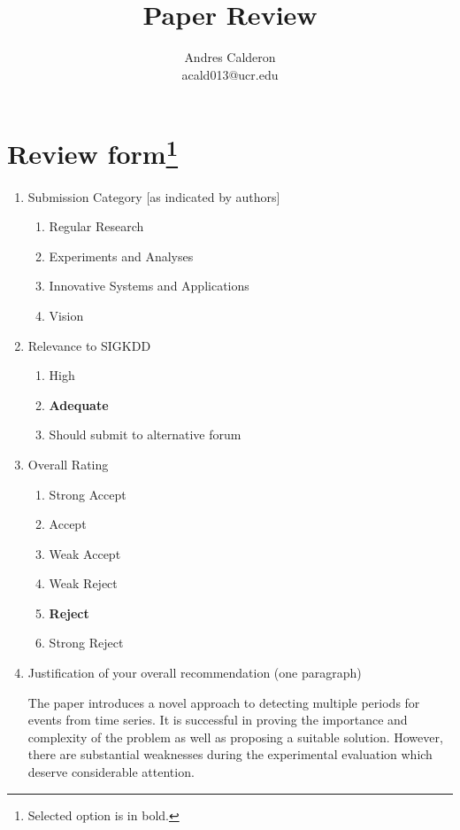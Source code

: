 \documentclass{article}
\title{Paper Review}
\author{Andres Calderon \\ acald013@ucr.edu}
\begin{document}
\maketitle

\section[Review form]{Review form\footnote{Selected option is in bold.}}
\begin{enumerate}
 \item Submission Category [as indicated by authors]
 \begin{enumerate}[I]
  \item Regular Research
  \item Experiments and Analyses
  \item Innovative Systems and Applications
  \item Vision
 \end{enumerate}
 
 \item Relevance to SIGKDD
 \begin{enumerate}[I]
  \item High
  \item \textbf{Adequate}
  \item Should submit to alternative forum
 \end{enumerate}

 \item Overall Rating
 \begin{enumerate}[I]
  \item Strong Accept
  \item Accept
  \item Weak Accept
  \item Weak Reject
  \item \textbf{Reject}
  \item Strong Reject
 \end{enumerate}
 
 \item Justification of your overall recommendation (one paragraph) \\ 
 \begin{framed}
  The paper introduces a novel approach to detecting multiple periods for events from time series.  It is successful in proving the importance and complexity of the problem as well as proposing a suitable solution.  However, there are substantial weaknesses during the experimental evaluation which deserve considerable attention.
 \end{framed}
 

\end{enumerate}
\end{document}
